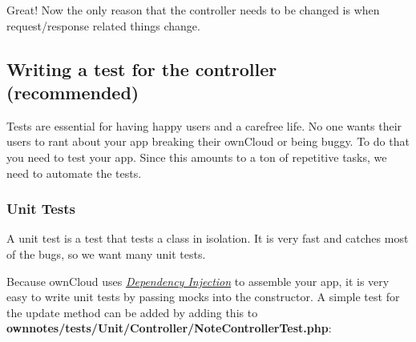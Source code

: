 \documentclass[letterpaper,10pt,english]{sphinxmanual}
\begin{document}
Great! Now the only reason that the controller needs to be changed is when request/response related things change.


\subsection{Writing a test for the controller (recommended)}
\label{app/tutorial:writing-a-test-for-the-controller-recommended}
Tests are essential for having happy users and a carefree life. No one wants their users to rant about your app breaking their ownCloud or being buggy. To do that you need to test your app. Since this amounts to a ton of repetitive tasks, we need to automate the tests.


\subsubsection{Unit Tests}
\label{app/tutorial:unit-tests}
A unit test is a test that tests a class in isolation. It is very fast and catches most of the bugs, so we want many unit tests.

Because ownCloud uses {\hyperref[app/container::doc]{\emph{\emph{Dependency Injection}}}} to assemble your app, it is very easy to write unit tests by passing mocks into the constructor. A simple test for the update method can be added by adding this to \textbf{ownnotes/tests/Unit/Controller/NoteControllerTest.php}:
\end{document}
